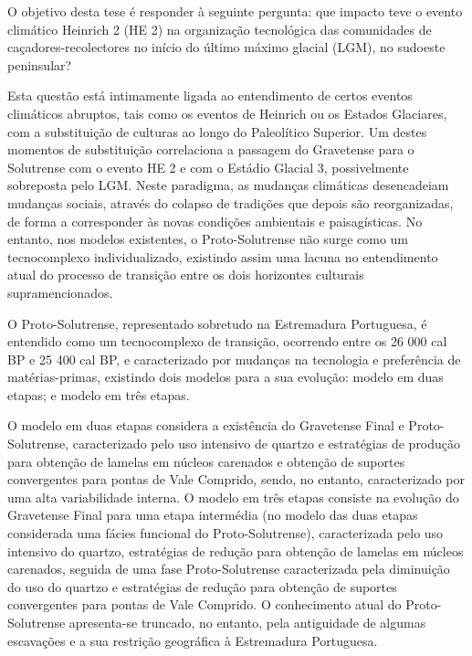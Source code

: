 \documentclass[12pt,twoside]{reedthesis}
\begin{document}
  \begin{resumo}
    O objetivo desta tese é responder à seguinte pergunta: que impacto teve o evento climático Heinrich 2 (HE 2) na organização tecnológica das comunidades de caçadores-recolectores no início do último máximo glacial (LGM), no sudoeste peninsular?
    
    \par
    
    Esta questão está intimamente ligada ao entendimento de certos eventos climáticos abruptos, tais como os eventos de Heinrich ou os Estados Glaciares, com a substituição de culturas ao longo do Paleolítico Superior. Um destes momentos de substituição correlaciona a passagem do Gravetense para o Solutrense com o evento HE 2 e com o Estádio Glacial 3, possivelmente sobreposta pelo LGM. Neste paradigma, as mudanças climáticas desencadeiam mudanças sociais, através do colapso de tradições que depois são reorganizadas, de forma a corresponder às novas condições ambientais e paisagísticas. No entanto, nos modelos existentes, o Proto-Solutrense não surge como um tecnocomplexo individualizado, existindo assim uma lacuna no entendimento atual do processo de transição entre os dois horizontes culturais supramencionados.
    
    O Proto-Solutrense, representado sobretudo na Estremadura Portuguesa, é entendido como um tecnocomplexo de transição, ocorrendo entre os 26 000 cal BP e 25 400 cal BP, e caracterizado por mudanças na tecnologia e preferência de matérias-primas, existindo dois modelos para a sua evolução: modelo em duas etapas; e modelo em três etapas.
    
    O modelo em duas etapas considera a existência do Gravetense Final e Proto-Solutrense, caracterizado pelo uso intensivo de quartzo e estratégias de produção para obtenção de lamelas em núcleos carenados e obtenção de suportes convergentes para pontas de Vale Comprido, sendo, no entanto, caracterizado por uma alta variabilidade interna. O modelo em três etapas consiste na evolução do Gravetense Final para uma etapa intermédia (no modelo das duas etapas considerada uma fácies funcional do Proto-Solutrense), caracterizada pelo uso intensivo do quartzo, estratégias de redução para obtenção de lamelas em núcleos carenados, seguida de uma fase Proto-Solutrense caracterizada pela diminuição do uso do quartzo e estratégias de redução para obtenção de suportes convergentes para pontas de Vale Comprido.
    O conhecimento atual do Proto-Solutrense apresenta-se truncado, no entanto, pela antiguidade de algumas escavações e a sua restrição geográfica à Estremadura Portuguesa.
    

\end{resumo}
\end{document}
